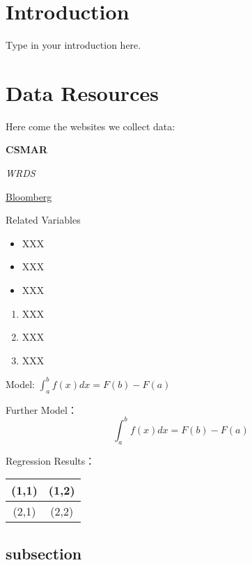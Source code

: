 \documentclass[11pt,a4paper]{article}
\begin{document}
\cover
\thispagestyle{empty}
\newpage

\tableofcontents
\thispagestyle{empty}
\newpage

\section{Introduction}

Type in your introduction here.

\newpage

\section{Data Resources}

Here come the websites we collect data:

\textbf{CSMAR}

\textit{WRDS}

\underline{Bloomberg}

Related Variables

\begin{itemize}
    \item XXX
    \item XXX
    \item XXX
\end{itemize}

\begin{enumerate}
    \item XXX
    \item XXX
    \item XXX
\end{enumerate}

Model: $\int_a^b f(x)dx = F(b)-F(a)$

Further Model：
\begin{equation}
    \int_a^b f(x)dx = F(b)-F(a)
\end{equation}


Regression Results：
\begin{tabular}{|c|c|}%
\hline  %
(1,1)&(1,2)\\
\hline  %
(2,1)&(2,2)\\
\hline %
\end{tabular}

\subsection{subsection}
\end{document}
